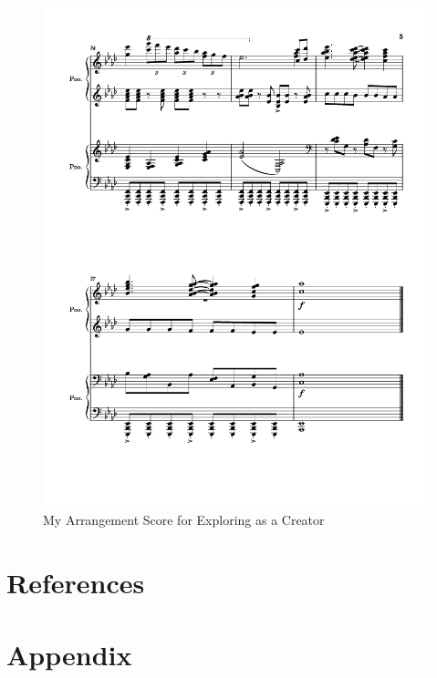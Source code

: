 \documentclass[12pt]{article}
\begin{document}
\begin{figure}[H]
\begin{tabular}{cc}
\end{tabular}
\includegraphics[width=0.4\linewidth, trim=30 100 30 20, clip]{octopathscore/octopathscore1024_5.png}
\caption{My Arrangement Score for Exploring as a Creator}
\end{figure}
\fi

\section{References}
\printbibliography[heading=none]

\section{Appendix}



\end{document}

